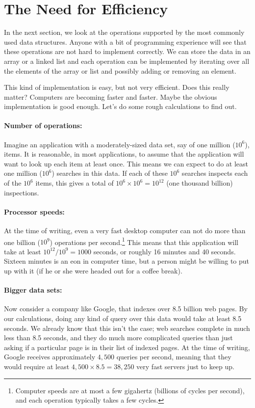 \documentclass[10pt]{book}
\theoremstyle{plain}
\theoremstyle{definition}
\begin{document}
\section{The Need for Efficiency}

In the next section, we look at the operations supported by the most
commonly used data structures.  Anyone with a bit of programming
experience will see that these operations are not hard to implement
correctly.  We can store the data in an array or a linked list and each
operation can be implemented by iterating over all the elements of the
array or list and possibly adding or removing an element.

This kind of implementation is easy, but not very efficient.  Does this
really matter?  Computers are becoming faster and faster. Maybe the
obvious implementation is good enough. Let's do some rough calculations
to find out.

\paragraph{Number of operations:}  Imagine an application with a
moderately-sized data set, say of one million ($10^6$), items.  It is
reasonable, in most applications, to assume that the application will
want to look up each item at least once.  This means we can expect to do
at least one million ($10^6$) searches in this data.  If each of these
$10^6$ searches inspects  each of the $10^6$ items, this gives a total
of $10^6\times 10^6=10^{12}$ (one thousand billion) inspections.

\paragraph{Processor speeds:} At the time of writing, even a very fast
desktop computer can not do more than one billion ($10^9$) operations per
second.\footnote{Computer speeds are at most a few gigahertz (billions
of cycles per second), and each operation typically takes a few cycles.}
This means that this application will take at least $10^{12}/10^9 = 1000$
seconds, or roughly 16 minutes and 40 seconds.  Sixteen minutes is an
eon in computer time, but a person might be willing to put up with it
(if he or she were headed out for a coffee break).


\paragraph{Bigger data sets:} Now consider a company like Google,
%
that
indexes over 8.5 billion web pages.  By our calculations, doing any kind
of query over this data would take at least 8.5 seconds.  We already
know that this isn't the case; web searches complete in much less than
8.5 seconds, and they do much more complicated queries than just asking
if a particular page is in their list of indexed pages.  At the time
of writing, Google receives approximately $4,500$ queries per second,
meaning that they would require at least $4,500\times 8.5=38,250$ very
fast servers just to keep up.
\end{document}
